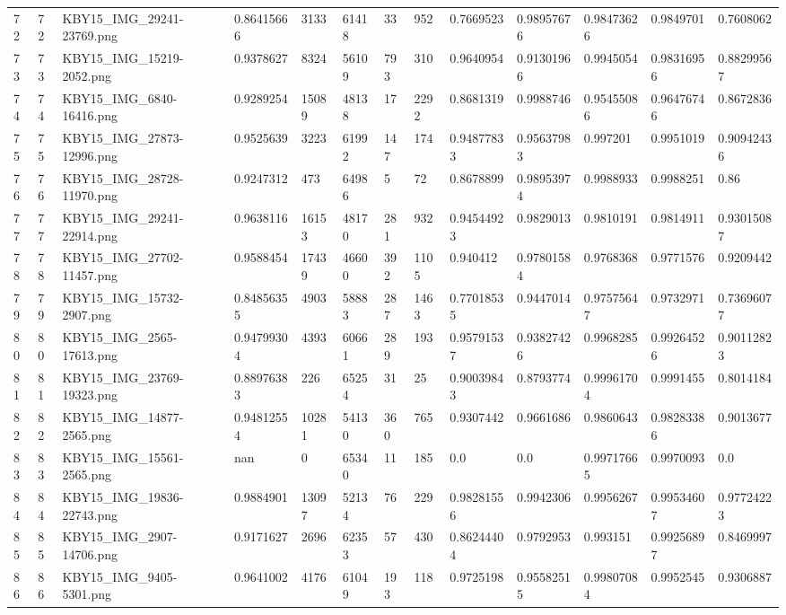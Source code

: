 \documentclass[11pt, a4paper, twoside]{report}
\begin{document}
\begin{longtable}[c]{@{}lllllllllllll@{}}
72 & 72 & KBY15\_IMG\_29241-23769.png & 0.86415666 & 3133 & 61418 & 33 & 952 & 0.7669523 & 0.98957676 & 0.98473626 & 0.9849701 & 0.7608062 \\
73 & 73 & KBY15\_IMG\_15219-2052.png & 0.9378627 & 8324 & 56109 & 793 & 310 & 0.9640954 & 0.91301966 & 0.9945054 & 0.98316956 & 0.88299567 \\
74 & 74 & KBY15\_IMG\_6840-16416.png & 0.9289254 & 15089 & 48138 & 17 & 2292 & 0.8681319 & 0.9988746 & 0.95455086 & 0.96476746 & 0.8672836 \\
75 & 75 & KBY15\_IMG\_27873-12996.png & 0.9525639 & 3223 & 61992 & 147 & 174 & 0.94877833 & 0.95637983 & 0.997201 & 0.9951019 & 0.90942436 \\
76 & 76 & KBY15\_IMG\_28728-11970.png & 0.9247312 & 473 & 64986 & 5 & 72 & 0.8678899 & 0.98953974 & 0.9988933 & 0.9988251 & 0.86 \\
77 & 77 & KBY15\_IMG\_29241-22914.png & 0.9638116 & 16153 & 48170 & 281 & 932 & 0.94544923 & 0.9829013 & 0.9810191 & 0.9814911 & 0.93015087 \\
78 & 78 & KBY15\_IMG\_27702-11457.png & 0.9588454 & 17439 & 46600 & 392 & 1105 & 0.940412 & 0.97801584 & 0.9768368 & 0.9771576 & 0.9209442 \\
79 & 79 & KBY15\_IMG\_15732-2907.png & 0.84856355 & 4903 & 58883 & 287 & 1463 & 0.77018535 & 0.9447014 & 0.97575647 & 0.9732971 & 0.73696077 \\
80 & 80 & KBY15\_IMG\_2565-17613.png & 0.94799304 & 4393 & 60661 & 289 & 193 & 0.95791537 & 0.93827426 & 0.9968285 & 0.99264526 & 0.90112823 \\
81 & 81 & KBY15\_IMG\_23769-19323.png & 0.88976383 & 226 & 65254 & 31 & 25 & 0.90039843 & 0.8793774 & 0.99961704 & 0.9991455 & 0.8014184 \\
82 & 82 & KBY15\_IMG\_14877-2565.png & 0.94812554 & 10281 & 54130 & 360 & 765 & 0.9307442 & 0.9661686 & 0.9860643 & 0.98283386 & 0.9013677 \\
83 & 83 & KBY15\_IMG\_15561-2565.png & nan & 0 & 65340 & 11 & 185 & 0.0 & 0.0 & 0.99717665 & 0.9970093 & 0.0 \\
84 & 84 & KBY15\_IMG\_19836-22743.png & 0.9884901 & 13097 & 52134 & 76 & 229 & 0.98281556 & 0.9942306 & 0.9956267 & 0.99534607 & 0.97724223 \\
85 & 85 & KBY15\_IMG\_2907-14706.png & 0.9171627 & 2696 & 62353 & 57 & 430 & 0.86244404 & 0.9792953 & 0.993151 & 0.99256897 & 0.8469997 \\
86 & 86 & KBY15\_IMG\_9405-5301.png & 0.9641002 & 4176 & 61049 & 193 & 118 & 0.9725198 & 0.95582515 & 0.99807084 & 0.9952545 & 0.9306887 \\

\end{longtable}
\end{document}
